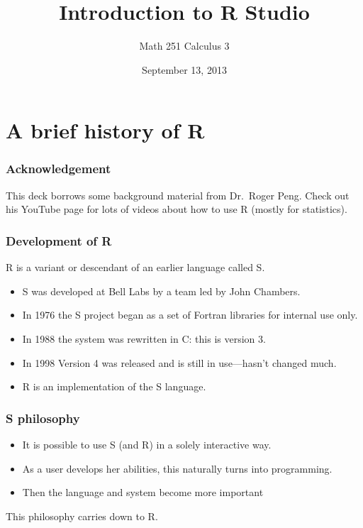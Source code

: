 \documentclass[11pt,ignorenonframetext,]{beamer}
\title{Introduction to R Studio}
\author{Math 251 Calculus 3}
\date{September 13, 2013 }
\begin{document}
\frame{\titlepage}

\section{A brief history of R}

\begin{frame}\frametitle{Acknowledgement}

This deck borrows some background material from Dr.~Roger Peng. Check
out his YouTube page for lots of videos about how to use R (mostly for
statistics).

\end{frame}

\begin{frame}\frametitle{Development of R}

R is a variant or descendant of an earlier language called S.

\begin{itemize}[<+->]
\itemsep1pt\parskip0pt
\item
  S was developed at Bell Labs by a team led by John Chambers.
\item
  In 1976 the S project began as a set of Fortran libraries for internal
  use only.
\item
  In 1988 the system was rewritten in C: this is version 3.
\item
  In 1998 Version 4 was released and is still in use---hasn't changed
  much.
\item
  R is an implementation of the S language.
\end{itemize}

\end{frame}

\begin{frame}\frametitle{S philosophy}

\begin{itemize}[<+->]
\itemsep1pt\parskip0pt
\item
  It is possible to use S (and R) in a solely interactive way.
\item
  As a user develops her abilities, this naturally turns into
  programming.
\item
  Then the language and system become more important
\end{itemize}

This philosophy carries down to R.

\end{frame}
\end{document}
